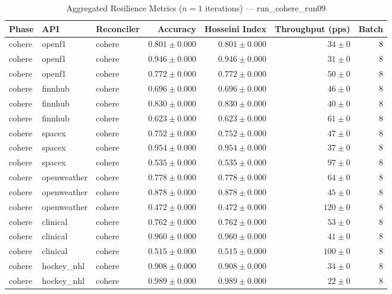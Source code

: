 
\begin{table}[htbp]
\caption{Aggregated Resilience Metrics ($n=1$ iterations) --- run_cohere_run09}
\begin{tabular}{l l l r r r r}
\hline
Phase & API & Reconciler & Accuracy & Hosseini Index & Throughput (pps) & Batch \\
\hline
cohere & openf1 & cohere & $0.801\pm0.000$ & $0.801\pm0.000$ & $34\pm0$ & 8 \\
cohere & openf1 & cohere & $0.946\pm0.000$ & $0.946\pm0.000$ & $31\pm0$ & 8 \\
cohere & openf1 & cohere & $0.772\pm0.000$ & $0.772\pm0.000$ & $50\pm0$ & 8 \\
cohere & finnhub & cohere & $0.696\pm0.000$ & $0.696\pm0.000$ & $46\pm0$ & 8 \\
cohere & finnhub & cohere & $0.830\pm0.000$ & $0.830\pm0.000$ & $40\pm0$ & 8 \\
cohere & finnhub & cohere & $0.623\pm0.000$ & $0.623\pm0.000$ & $61\pm0$ & 8 \\
cohere & spacex & cohere & $0.752\pm0.000$ & $0.752\pm0.000$ & $47\pm0$ & 8 \\
cohere & spacex & cohere & $0.954\pm0.000$ & $0.954\pm0.000$ & $37\pm0$ & 8 \\
cohere & spacex & cohere & $0.535\pm0.000$ & $0.535\pm0.000$ & $97\pm0$ & 8 \\
cohere & openweather & cohere & $0.778\pm0.000$ & $0.778\pm0.000$ & $64\pm0$ & 8 \\
cohere & openweather & cohere & $0.878\pm0.000$ & $0.878\pm0.000$ & $45\pm0$ & 8 \\
cohere & openweather & cohere & $0.472\pm0.000$ & $0.472\pm0.000$ & $120\pm0$ & 8 \\
cohere & clinical & cohere & $0.762\pm0.000$ & $0.762\pm0.000$ & $53\pm0$ & 8 \\
cohere & clinical & cohere & $0.960\pm0.000$ & $0.960\pm0.000$ & $41\pm0$ & 8 \\
cohere & clinical & cohere & $0.515\pm0.000$ & $0.515\pm0.000$ & $100\pm0$ & 8 \\
cohere & hockey\_nhl & cohere & $0.908\pm0.000$ & $0.908\pm0.000$ & $34\pm0$ & 8 \\
cohere & hockey\_nhl & cohere & $0.989\pm0.000$ & $0.989\pm0.000$ & $22\pm0$ & 8 \\

\end{tabular}
\end{table}
